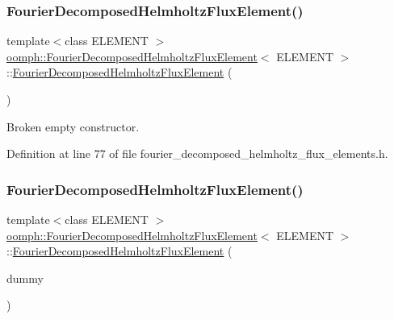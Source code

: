 \subsubsection{\texorpdfstring{Fourier\+Decomposed\+Helmholtz\+Flux\+Element()}{FourierDecomposedHelmholtzFluxElement()}\hspace{0.1cm}{\footnotesize\ttfamily [2/3]}}
{\footnotesize\ttfamily template$<$class E\+L\+E\+M\+E\+NT $>$ \\
\hyperlink{classoomph_1_1FourierDecomposedHelmholtzFluxElement}{oomph\+::\+Fourier\+Decomposed\+Helmholtz\+Flux\+Element}$<$ E\+L\+E\+M\+E\+NT $>$\+::\hyperlink{classoomph_1_1FourierDecomposedHelmholtzFluxElement}{Fourier\+Decomposed\+Helmholtz\+Flux\+Element} (\begin{DoxyParamCaption}{ }\end{DoxyParamCaption})\hspace{0.3cm}{\ttfamily [inline]}}



Broken empty constructor. 



Definition at line 77 of file fourier\+\_\+decomposed\+\_\+helmholtz\+\_\+flux\+\_\+elements.\+h.

\mbox{\label{classoomph_1_1FourierDecomposedHelmholtzFluxElement_a99d9d227f9336069444cacce81ffe467}} 
\subsubsection{\texorpdfstring{Fourier\+Decomposed\+Helmholtz\+Flux\+Element()}{FourierDecomposedHelmholtzFluxElement()}\hspace{0.1cm}{\footnotesize\ttfamily [3/3]}}
{\footnotesize\ttfamily template$<$class E\+L\+E\+M\+E\+NT $>$ \\
\hyperlink{classoomph_1_1FourierDecomposedHelmholtzFluxElement}{oomph\+::\+Fourier\+Decomposed\+Helmholtz\+Flux\+Element}$<$ E\+L\+E\+M\+E\+NT $>$\+::\hyperlink{classoomph_1_1FourierDecomposedHelmholtzFluxElement}{Fourier\+Decomposed\+Helmholtz\+Flux\+Element} (\begin{DoxyParamCaption}\item[{const \hyperlink{classoomph_1_1FourierDecomposedHelmholtzFluxElement}{Fourier\+Decomposed\+Helmholtz\+Flux\+Element}$<$ E\+L\+E\+M\+E\+NT $>$ \&}]{dummy }\end{DoxyParamCaption})\hspace{0.3cm}{\ttfamily [inline]}}



